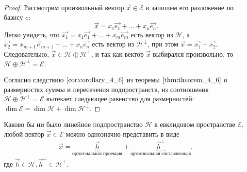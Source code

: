 \begin{proof}
    Рассмотрим произвольный вектор $\vec{x} \in \mathcal{E}$ и запишем его разложение по базису $e$:
    $$\vec{x} = x_1\vec{e_1} + \ldots + x_n\vec{e_n}.$$
    Легко увидеть, что $\vec{x_1} = x_1\vec{e_1} + \ldots + x_m\vec{e_m}$ есть вектор из $\mathcal{H}$, а $\vec{x_2} = x_{m + 1}\vec{e}_{m + 1} + \ldots + x_n\vec{e_n}$ есть вектор из $\mathcal{H}^\perp$, при этом $\vec{x} = \vec{x_1} + \vec{x_2}$. Следовательно, $\vec{x} \in \mathcal{H} \oplus \mathcal{H}^\perp$, и так как вектор $\vec{x}$ выбирался произвольно, то $\mathcal{H} \oplus \mathcal{H}^\perp = \mathcal{E}$.

    Согласно следствию $\eqref{cor:corollary_4_6}$ из теоремы $\eqref{thm:theorem_4_6}$ о размерностях суммы и пересечения подпространств, из соотношения $\mathcal{H} \oplus \mathcal{H}^\perp = \mathcal{E}$ вытекает следующее равенство для размерностей: $\dim \mathcal{E} = \dim \mathcal{H} + \dim \mathcal{H}^\perp$.
\end{proof}

\begin{corollary}
    Каково бы ни было линейное подпространство $\mathcal{H}$ в евклидовом пространстве $\mathcal{E}$, любой вектор $\vec{x} \in \mathcal{E}$ можно однозначно представить в виде
    \begin{equation}
        \vec{x} = \underbrace{\vec{h}}_{\text{ортогональная проекция}} + \underbrace{\vec{h}^\perp}_{\text{ортогональная составляющая}},
    \end{equation}
    где $\vec{h} \in \mathcal{H}, \vec{h}^\perp \in \mathcal{H}^\perp$.
\end{corollary}
